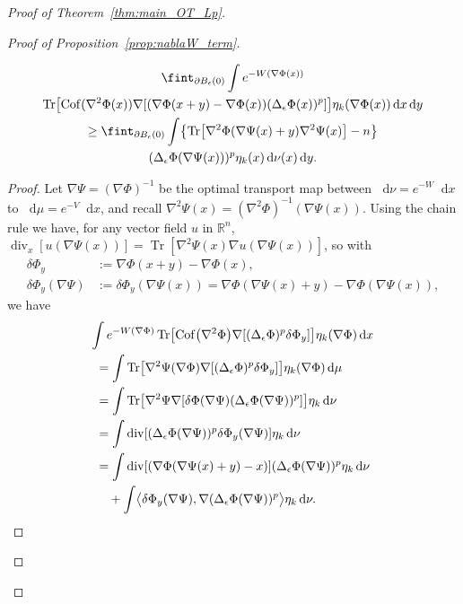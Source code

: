 \documentclass[AHL,Unicode,longabstracts]{cedram}
\newcommand{\R}{\mathbb R}
\DeclareMathOperator{\Tr}{Tr}
\DeclareMathOperator{\Cof}{Cof}
\DeclareMathOperator{\Div}{div}
\newcommand{\V}{V}
\newcommand{\W}{W}
\newcommand{\dd}{n}
\newcommand{\source}{\mu}
\newcommand{\target}{\nu}
\newcommand*\diff{\mathop{}\!\mathrm{d}}
\newcommand{\OT}{\Phi}
\newcommand{\avgint}{\fint}
\newcommand{\findiff}{\delta\OT}
\let\originalleft\left
\let\originalright\right
\renewcommand{\left}{\mathopen{}\mathclose\bgroup\originalleft}
\renewcommand{\right}{\aftergroup\egroup\originalright}
\begin{document}
\begin{proof}[Proof of Theorem~\ref{thm:main_OT_Lp}]
\begin{proof}[Proof of Proposition~\ref{prop:nablaW_term}]
\begin{lemm}\label{lem:1term}
\begin{multline}\label{eq:1term}
\avgint_{\partial B_{\epsilon}(0)}\int e^{-\W(\nabla\OT(x))}\\ \Tr\bigl[\Cof(\nabla^2\OT(x))\nabla\left[(\nabla \OT(x+y)
-\nabla \OT(x))(\Delta_{\epsilon}\OT(x))^p\right]\bigr]\eta_k(\nabla\OT(x))\diff x\diff y\\
\ge \avgint_{\partial B_{\epsilon}(0)}\int\left \{\Tr\left[\nabla^2\OT(\nabla\Psi(x)+y)\nabla^2\Psi(x)\right]-\dd\right\}\\(\Delta_{\epsilon}\OT(\nabla\Psi(x)))^p \eta_k(x)\diff \target(x)\diff y.
\end{multline}
\end{lemm}
\begin{proof}
Let $\nabla\Psi=(\nabla \OT)^{-1}$ be the optimal transport map between $\diff \target=e^{-\W}\diff x$ to $\diff \source=e^{-\V}\diff x$, and recall $\nabla^2\Psi(x)=(\nabla^2\OT)^{-1}(\nabla\Psi(x))$. Using the chain rule we have, for any vector field $u$ in $\R^{\dd}$, $\Div_x[u(\nabla \Psi(x))]=\Tr[\nabla^2 \Psi(x)\nabla u(\nabla \Psi(x))]$, so with
\begin{align*}
\findiff_y &:=\nabla \OT(x+y)-\nabla \OT(x), \\
\findiff_y(\nabla\Psi) &:=\findiff_y(\nabla\Psi(x))=\nabla \OT(\nabla\Psi(x)+y)-\nabla \OT(\nabla\Psi(x)),
\end{align*}
we have
\begin{multline*}
\int e^{-\W(\nabla\OT)} \Tr\left[\Cof\bigl(\nabla^2\OT\bigr)\nabla[(\Delta_{\epsilon}\OT)^p\findiff_y]\right]\eta_k(\nabla\OT)\diff x\\
\begin{aligned}
&=\int \Tr\left[\nabla^2\Psi(\nabla\OT)\nabla[(\Delta_{\epsilon}\OT)^p\findiff_y]\right]\eta_k(\nabla\OT)\diff \source\\
&=\int \Tr\left[\nabla^2\Psi\nabla[\findiff(\nabla\Psi)(\Delta_{\epsilon}\OT(\nabla\Psi))^p]\right]\eta_k\diff \target\\
&=\int \Div[(\Delta_{\epsilon}\OT(\nabla\Psi))^p \findiff_y(\nabla\Psi)]\eta_k\diff \target\\
&=\int \Div[\left(\nabla \OT(\nabla\Psi(x)+y)-x\right)](\Delta_{\epsilon}\OT(\nabla\Psi))^p \eta_k\diff \target\\
&\quad+\int \bigl\langle\findiff_y(\nabla\Psi),\nabla(\Delta_{\epsilon}\OT(\nabla\Psi))^p \bigr\rangle\eta_k\diff \target.
\end{aligned}
\end{multline*}

\end{proof}
\end{proof}
\end{proof}
\end{document}
